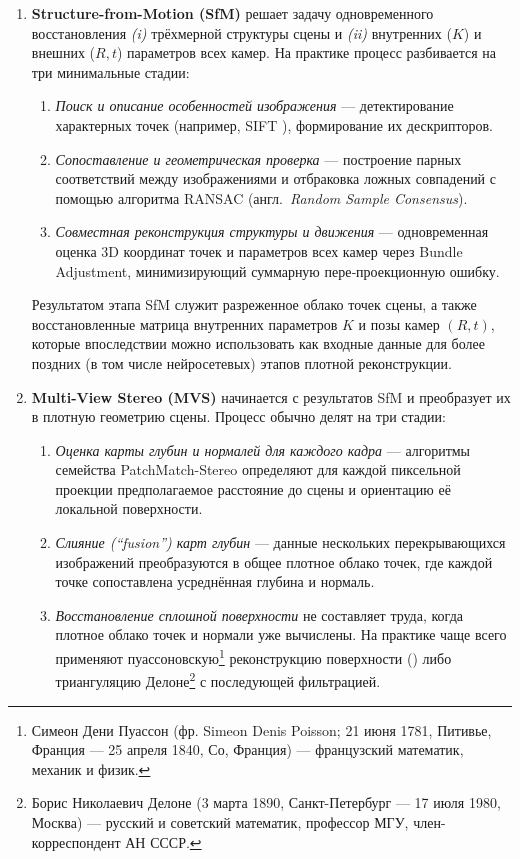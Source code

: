 \begin{enumerate}
  \item \textbf{Structure-from-Motion (SfM)} решает задачу одновременного восстановления \emph{(i)} трёхмерной структуры
  сцены и \emph{(ii)} внутренних ($K$) и внешних ($R,t$) параметров всех камер.
  На практике процесс разбивается на три минимальные стадии:

  \begin{enumerate}
    \item \emph{Поиск и описание особенностей изображения} — детектирование
    характерных точек (например, \textsc{SIFT} \cite{lowe2004distinctiveimagefeatures}), формирование их дескрипторов.
    \item \emph{Сопоставление и геометрическая проверка} — построение парных
    соответствий между изображениями и отбраковка ложных совпадений с помощью
    алгоритма RANSAC (англ.\ \emph{Random Sample Consensus}).
    \item \emph{Совместная реконструкция структуры и движения} —
     одновременная оценка 3D координат точек и параметров всех камер через
     Bundle Adjustment, минимизирующий суммарную пере‑проекционную ошибку.
  \end{enumerate}

  Результатом этапа SfM служит разреженное облако точек сцены, а также
  восстановленные матрица внутренних параметров $K$ и позы камер $(R,t)$,
  которые впоследствии можно использовать как входные данные для более поздних
  (в том числе нейросетевых) этапов плотной реконструкции.

  \item \textbf{Multi-View Stereo (MVS)} начинается с результатов SfM и
  преобразует их в плотную геометрию сцены. Процесс обычно делят на три
  стадии:

  \begin{enumerate}
    \item \emph{Оценка карты глубин и нормалей для каждого кадра} — алгоритмы
    семейства PatchMatch-Stereo определяют для каждой пиксельной проекции
    предполагаемое расстояние до сцены и ориентацию её локальной поверхности.
    \item \emph{Слияние (``fusion'') карт глубин} — данные нескольких
    перекрывающихся изображений преобразуются в общее плотное облако точек, где
    каждой точке сопоставлена усреднённая глубина и нормаль.
    \item \emph{Восстановление сплошной поверхности} не составляет труда, когда
    плотное облако точек и нормали уже вычислены. На практике чаще всего
    применяют пуассоновскую\footnote{Симеон Дени Пуассон (фр. Simeon Denis
    Poisson; 21 июня 1781, Питивье, Франция — 25 апреля 1840, Со, Франция) —
    французский математик, механик и физик.} реконструкцию поверхности
    (\cite{10.1145/2487228.2487237}) либо триангуляцию Делоне\footnote{Борис
    Николаевич Делоне (3 марта 1890, Санкт-Петербург — 17 июля 1980,
    Москва) — русский и советский математик, профессор МГУ, член-корреспондент
    АН СССР.} с последующей фильтрацией.
  \end{enumerate}


\end{enumerate}
